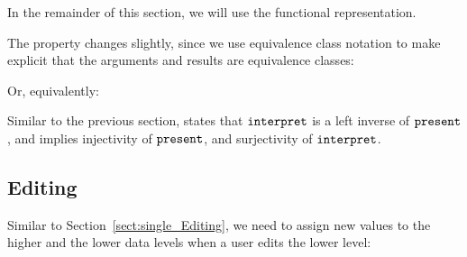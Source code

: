 In the remainder of this section, we will use the functional representation.




%
%



The  property changes slightly, since we use equivalence class notation to make explicit that the arguments and results are equivalence classes:


Or, equivalently:


Similar to the previous section,  states that ${\tt interpret}$ is a left inverse of ${\tt present}$, and implies injectivity of ${\tt present}$, and surjectivity of ${\tt interpret}$.




\subsection{Editing} \label{sect:singleExtra_Editing}

Similar to Section~\ref{sect:single_Editing}, we need to assign new values to the higher and the lower data levels when a user edits the lower level:


